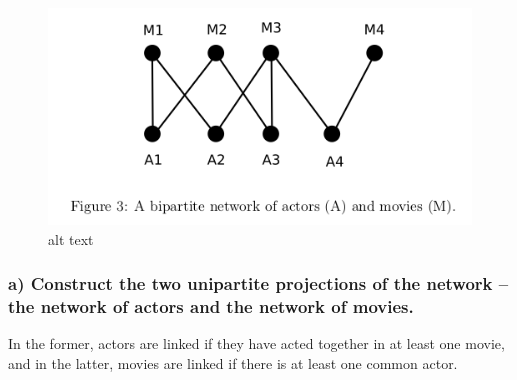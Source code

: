 \documentclass[11pt]{article}
\makeatletter
\def\maxwidth{\ifdim\Gin@nat@width>\linewidth\linewidth
    \else\Gin@nat@width\fi}
\let\Oldincludegraphics\includegraphics
\renewcommand{\includegraphics}[1]{\Oldincludegraphics[width=.8\maxwidth]{#1}}
\makeatother
\begin{document}
\begin{figure}
\centering
\includegraphics{../assets/fig3.png}
\caption{alt text}
\end{figure}

\subsubsection{a) Construct the two unipartite projections of the
network -- the network of actors and the network of
movies.}\label{a-construct-the-two-unipartite-projections-of-the-network-the-network-of-actors-and-the-network-of-movies.}

In the former, actors are linked if they have acted together in at least
one movie, and in the latter, movies are linked if there is at least one
common actor.
\end{document}
